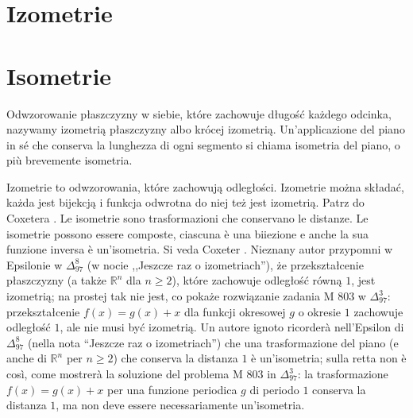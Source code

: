 
%

\section{Izometrie} %
\section{Isometrie} %


\begin{definition}
    Odwzorowanie płaszczyzny w siebie, które zachowuje długość każdego odcinka, nazywamy izometrią płaszczyzny albo krócej izometrią. %
    Un'applicazione del piano in sé che conserva la lunghezza di ogni segmento si chiama isometria del piano, o più brevemente isometria. %
\end{definition}

Izometrie to odwzorowania, które zachowują odległości. %
Izometrie można składać, każda jest bijekcją i funkcja odwrotna do niej też jest izometrią. %
Patrz do Coxetera \cite[s. 45-52, 56-63]{coxeter_1967}. %
Le isometrie sono trasformazioni che conservano le distanze. %
Le isometrie possono essere composte, ciascuna è una biiezione e anche la sua funzione inversa è un'isometria. %
Si veda Coxeter \cite[pp.~45--52, 56--63]{coxeter_1967}. %
Nieznany autor przypomni w Epsilonie w $\Delta_{97}^8$ (w nocie ,,Jeszcze raz o izometriach''), że przekształcenie płaszczyzny (a także $\mathbb R^n$ dla $n \ge 2$), które zachowuje odległość równą $1$, jest izometrią; na prostej tak nie jest, co pokaże rozwiązanie zadania M 803 w $\Delta_{97}^3$: przekształcenie $f(x) = g(x) + x$ dla funkcji okresowej $g$ o okresie $1$ zachowuje odległość $1$, ale nie musi być izometrią. %
Un autore ignoto ricorderà nell'Epsilon di $\Delta_{97}^8$ (nella nota ``Jeszcze raz o izometriach'') che una trasformazione del piano (e anche di $\mathbb R^n$ per $n \ge 2$) che conserva la distanza $1$ è un'isometria; sulla retta non è così, come mostrerà la soluzione del problema M 803 in $\Delta_{97}^3$: la trasformazione $f(x) = g(x) + x$ per una funzione periodica $g$ di periodo $1$ conserva la distanza $1$, ma non deve essere necessariamente un'isometria. %

